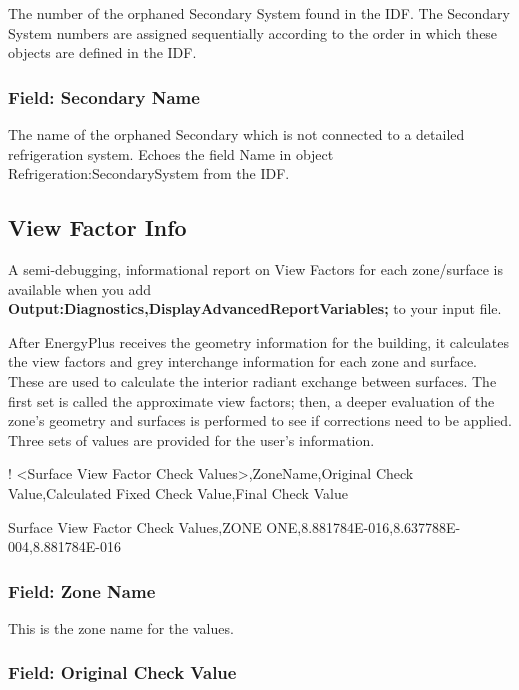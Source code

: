 The number of the orphaned Secondary System found in the IDF. The Secondary System numbers are assigned sequentially according to the order in which these objects are defined in the IDF.

\subsubsection{Field: Secondary Name}\label{field-secondary-name-2}

The name of the orphaned Secondary which is not connected to a detailed refrigeration system. Echoes the field Name in object Refrigeration:SecondarySystem from the IDF.

\subsection{View Factor Info}\label{view-factor-info}

A semi-debugging, informational report on View Factors for each zone/surface is available when you add \textbf{Output:Diagnostics,DisplayAdvancedReportVariables;} to your input file.

After EnergyPlus receives the geometry information for the building, it calculates the view factors and grey interchange information for each zone and surface. These are used to calculate the interior radiant exchange between surfaces. The first set is called the approximate view factors; then, a deeper evaluation of the zone's geometry and surfaces is performed to see if corrections need to be applied. Three sets of values are provided for the user's information.

! \textless{}Surface View Factor Check Values\textgreater{},ZoneName,Original Check Value,Calculated Fixed Check Value,Final Check Value

Surface View Factor Check Values,ZONE ONE,8.881784E-016,8.637788E-004,8.881784E-016

\subsubsection{Field: Zone Name}\label{field-zone-name-15}

This is the zone name for the values.

\subsubsection{Field: Original Check Value}\label{field-original-check-value}

